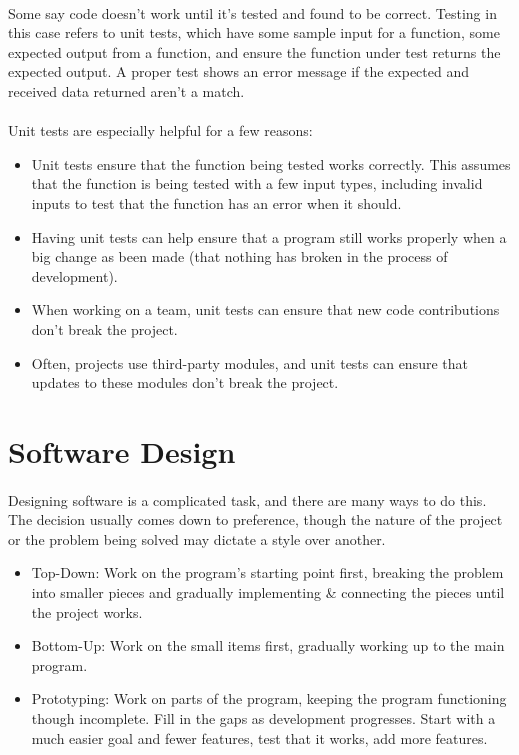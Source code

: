 \documentclass[letter,10pt]{article}
\begin{document}
\paragraph{}Some say code doesn't work until it's tested and found to be correct. Testing in this case refers to unit tests, which have some sample input for a function, some expected output from a function, and ensure the function under test returns the expected output. A proper test shows an error message if the expected and received data returned aren't a match.

\paragraph{}Unit tests are especially helpful for a few reasons:
\begin{itemize}
    \item Unit tests ensure that the function being tested works correctly. This assumes that the function is being tested with a few input types, including invalid inputs to test that the function has an error when it should.
    \item Having unit tests can help ensure that a program still works properly when a big change as been made (that nothing has broken in the process of development).
    \item When working on a team, unit tests can ensure that new code contributions don't break the project.
    \item Often, projects use third-party modules, and unit tests can ensure that updates to these modules don't break the project.
\end{itemize}

\section{Software Design}
\paragraph{}Designing software is a complicated task, and there are many ways to do this. The decision usually comes down to preference, though the nature of the project or the problem being solved may dictate a style over another.

\begin{itemize}
    \item Top-Down: Work on the program's starting point first, breaking the problem into smaller pieces and gradually implementing \& connecting the pieces until the project works.
    \item Bottom-Up: Work on the small items first, gradually working up to the main program.
    \item Prototyping: Work on parts of the program, keeping the program functioning though incomplete. Fill in the gaps as development progresses. Start with a much easier goal and fewer features, test that it works, add more features.
\end{itemize}
\end{document}
